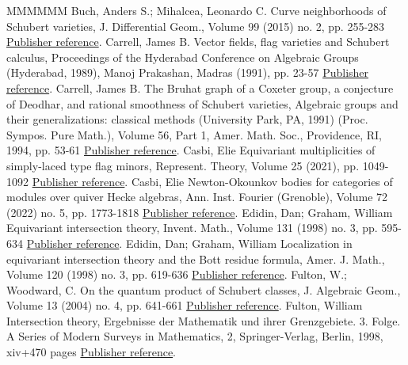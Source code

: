 \begin{thebibliography}{MMMMMM}
 Buch, Anders S.; Mihalcea, Leonardo C. Curve neighborhoods of Schubert varieties, J. Differential Geom., Volume 99 (2015) no. 2, pp. 255-283 \href{https://alco.centre-mersenne.org/articles/10.5802/alco.428/#buch.m:nbhds}{Publisher reference}.
 Carrell, James B. Vector fields, flag varieties and Schubert calculus, Proceedings of the Hyderabad Conference on Algebraic Groups (Hyderabad, 1989), Manoj Prakashan, Madras (1991), pp. 23-57 \href{https://alco.centre-mersenne.org/articles/10.5802/alco.428/#carrell:vector}{Publisher reference}.
 Carrell, James B. The Bruhat graph of a Coxeter group, a conjecture of Deodhar, and rational smoothness of Schubert varieties, Algebraic groups and their generalizations: classical methods (University Park, PA, 1991) (Proc. Sympos. Pure Math.), Volume 56, Part 1, Amer. Math. Soc., Providence, RI, 1994, pp. 53-61 \href{https://alco.centre-mersenne.org/articles/10.5802/alco.428/#carrell:bruhat}{Publisher reference}.
 Casbi, Elie Equivariant multiplicities of simply-laced type flag minors, Represent. Theory, Volume 25 (2021), pp. 1049-1092 \href{https://alco.centre-mersenne.org/articles/10.5802/alco.428/#Cas19}{Publisher reference}.
 Casbi, Elie Newton-Okounkov bodies for categories of modules over quiver Hecke algebras, Ann. Inst. Fourier (Grenoble), Volume 72 (2022) no. 5, pp. 1773-1818 \href{https://alco.centre-mersenne.org/articles/10.5802/alco.428/#casbi2019newton}{Publisher reference}.
 Edidin, Dan; Graham, William Equivariant intersection theory, Invent. Math., Volume 131 (1998) no. 3, pp. 595-634 \href{https://alco.centre-mersenne.org/articles/10.5802/alco.428/#edidin.graham:eqchow}{Publisher reference}.
 Edidin, Dan; Graham, William Localization in equivariant intersection theory and the Bott residue formula, Amer. J. Math., Volume 120 (1998) no. 3, pp. 619-636 \href{https://alco.centre-mersenne.org/articles/10.5802/alco.428/#edidin-graham:localization}{Publisher reference}.
 Fulton, W.; Woodward, C. On the quantum product of Schubert classes, J. Algebraic Geom., Volume 13 (2004) no. 4, pp. 641-661 \href{https://alco.centre-mersenne.org/articles/10.5802/alco.428/#fulton.woodward}{Publisher reference}.
 Fulton, William Intersection theory, Ergebnisse der Mathematik und ihrer Grenzgebiete. 3. Folge. A Series of Modern Surveys in Mathematics, 2, Springer-Verlag, Berlin, 1998, xiv+470 pages \href{https://alco.centre-mersenne.org/articles/10.5802/alco.428/#fulton:IT}{Publisher reference}.

\end{thebibliography}
